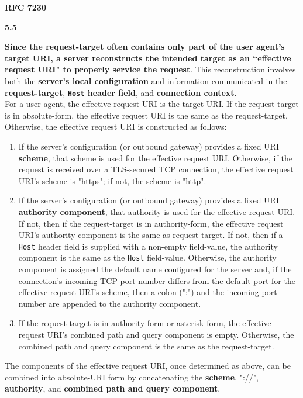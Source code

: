 \textbf{RFC 7230}
\columnseprule=1pt    %
\begin{multicols}{2}
	\begin{spacing}{0.8}
		\textbf{5.5} 
		{\footnotesize 
		\textbf{Since the request-target often contains only part of the user agent’s target URI, a server reconstructs the intended target as an ``effective request URI" to properly service the request}. This reconstruction involves both the \textbf{server’s local configuration} and information communicated in the \textbf{request-target}, \textbf{\texttt{Host} header field}, and \textbf{connection context}.\vspace{1.2ex}\\
		For a user agent, the effective request URI is the target URI. If the request-target is in absolute-form, the effective request URI is the same as the request-target. Otherwise, the effective request URI is constructed as follows:
	
		\begin{enumerate}
			\item If the server’s configuration (or outbound gateway) provides a
			fixed URI \textbf{scheme}, that scheme is used for the effective request URI. Otherwise, if the request is received over a TLS-secured TCP connection, the effective request URI’s scheme is "https"; if not, the scheme is "http".
			\item If the server’s configuration (or outbound gateway) provides a fixed URI \textbf{authority component}, that authority is used for the effective request URI. If not, then if the request-target is in authority-form, the effective request URI’s authority component is the same as request-target. If not, then if a \texttt{Host} header field is supplied with a non-empty field-value, the authority component is the same as the \texttt{Host} field-value. Otherwise, the authority component is assigned the default name configured for the server and, if the connection’s incoming TCP port number differs from the default port for the effective request URI’s scheme, then a colon (":") and the incoming port number are appended to the authority component.
			\item If the request-target is in authority-form or asterisk-form, the
			effective request URI’s combined path and query component is empty. Otherwise, the combined path and query component is the same as the request-target.
		
		\end{enumerate}
	
		The components of the effective request URI, once determined as above, can be combined into absolute-URI form by concatenating the \textbf{scheme}, "://", \textbf{authority}, and \textbf{combined path and query component}. }
	\end{spacing}
\end{multicols}	
	

